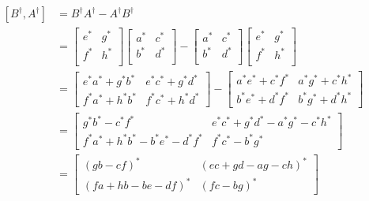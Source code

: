 \documentclass{article}
\begin{document}
\begin{align*}
\begin{split}
    [B^{\dagger}, A^{\dagger}] &= B^{\dagger}A^{\dagger} - A^{\dagger}B^{\dagger} \\
    &= 
    \begin{bmatrix}
        e^* & g^* \\ f^* & h^* \\
    \end{bmatrix}
    \begin{bmatrix}
        a^* & c^* \\ b^* & d^* \\
    \end{bmatrix}
    - \begin{bmatrix}
        a^* & c^* \\ b^* & d^* \\   
    \end{bmatrix}
    \begin{bmatrix}
        e^* & g^* \\ f^* & h^* \\
    \end{bmatrix} \\
    &=
    \begin{bmatrix}
        e^* a^* + g^* b^* & e^* c^* + g^* d^* \\
        f^* a^* + h^* b^* & f^* c^* + h^* d^*
    \end{bmatrix}
    - \begin{bmatrix}
        a^* e^* + c^* f^* & a^* g^* + c^* h^* \\
        b^* e^* + d^* f^* & b^* g^* + d^* h^*
    \end{bmatrix} \\
    &=
    \begin{bmatrix}
       g^* b^* - c^* f^* & e^* c^* + g^* d^* -a^* g^* - c^* h^* \\
        f^* a^* + h^* b^* - b^* e^* - d^* f^* & f^* c^* - b^* g^* 
    \end{bmatrix} \\
    &= 
    \begin{bmatrix}
        (gb - cf)^* & (ec + gd - ag - ch)^* \\
        (fa + hb - be - df)^* & (fc - bg)^*
    \end{bmatrix} \\\\
\end{split}
\end{align*}
\end{document}
